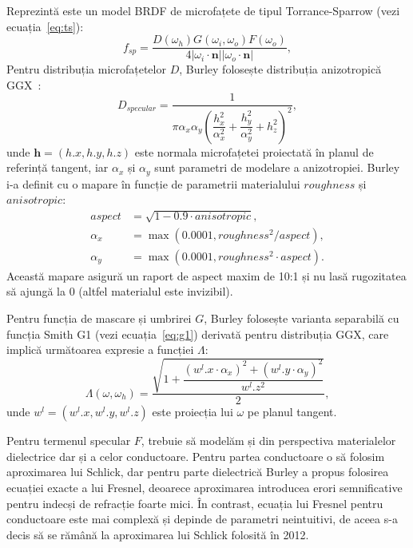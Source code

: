\documentclass[12pt,a4paper]{report}
\numberwithin{equation}{section} %
\begin{document}
Reprezintă este un model BRDF de microfațete de tipul Torrance-Sparrow (vezi ecuația~\ref{eq:ts}):
\begin{equation}\label{eq:disney_specular}
	f_{sp} = \dfrac{D(\omega_h)G(\omega_i, \omega_o)F(\omega_o)}{4|\omega_i \cdot \mathbf{n} ||\omega_o \cdot \mathbf{n}|},
\end{equation}
Pentru distribuția microfațetelor $D$, Burley folosește distribuția anizotropică GGX~\cite{WalterSmithG2}:
\begin{equation}
	D_{specular} = \dfrac{1}{\pi\alpha_x\alpha_y\left(\dfrac{h_x^2}{\alpha_x^2} + \dfrac{h_y^2}{\alpha_y^2} + h_z^2\right)^2},
\end{equation}
unde $\mathbf{h} = (h.x, h.y, h.z)$ este normala microfațetei proiectată în planul de referință tangent,
iar $\alpha_x$ și $\alpha_y$ sunt parametri de modelare a anizotropiei. Burley i-a definit
cu o mapare în funcție de parametrii materialului $roughness$ și $anisotropic$:
\begin{equation}
	\begin{aligned}
		aspect   & = \sqrt{1 - 0.9\cdot anisotropic},         \\
		\alpha_x & = \max(0.0001, roughness^2 / aspect),     \\
		\alpha_y & = \max(0.0001, roughness^2 \cdot aspect).
	\end{aligned}
\end{equation}
Această mapare asigură un raport de aspect maxim de 10:1 și nu lasă rugozitatea
să ajungă la 0 (altfel materialul este invizibil).

Pentru funcția de mascare și umbrirei $G$, Burley folosește varianta separabilă cu funcția Smith G1 (vezi ecuația~\ref{eq:g1}) derivată
pentru distribuția GGX, care implică următoarea expresie a funcției $\Lambda$:
\begin{equation}\label{eq:gamma}
	\Lambda(\omega, \omega_h) = \dfrac{\sqrt{1 + \dfrac{(w^l.x\cdot \alpha_x)^2 + (w^l.y\cdot \alpha_y)^2}{w^l.z^2}}}{2},
\end{equation}
unde $w^l = (w^l.x, w^l.y, w^l.z)$ este proiecția lui $\omega$ pe planul tangent.

Pentru termenul specular $F$, trebuie să modelăm și din perspectiva materialelor
dielectrice dar și a celor conductoare. Pentru partea conductoare o să folosim
aproximarea lui Schlick, dar pentru parte dielectrică Burley a propus folosirea
ecuației exacte a lui Fresnel, deoarece aproximarea introducea erori semnificative
pentru indecși de refracție foarte mici. În contrast, ecuația lui Fresnel pentru
conductoare este mai complexă și depinde de parametri neintuitivi, de aceea
s-a decis să se rămână la aproximarea lui Schlick folosită în 2012.
\end{document}
